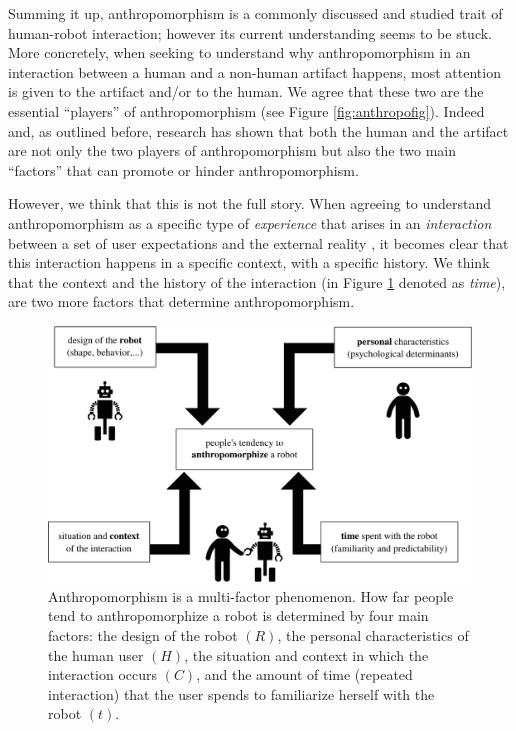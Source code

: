 \documentclass{frontiersSCNS} %
\begin{document}
Summing it up, anthropomorphism is a commonly discussed and studied trait of
human-robot interaction; however its current understanding seems to be stuck.
More concretely, when seeking to understand why anthropomorphism in an
interaction between a human and a non-human artifact happens, most attention is
given to the artifact and/or to the human. We agree that these two are the
essential ``players'' of anthropomorphism (see Figure \ref{fig:anthropofig}).
Indeed and, as outlined before, research has shown that both the human and the
artifact are not only the two players of anthropomorphism but also the two main
``factors'' that can promote or hinder anthropomorphism.

However, we think that this is not the full story. When agreeing to understand
anthropomorphism as a specific type of \textit{experience} that arises in an
\textit{interaction} between a set of user expectations and the external reality
\citep{persson_anthropomorphism_2000}, 
it becomes clear that this interaction happens in a specific context, with a
specific history. We think that the context and the history of the interaction
(in Figure \ref{fig:factors} denoted as \textit{time}), are two more factors
that determine anthropomorphism.

\begin{figure}
    \centering
    \includegraphics[width=0.7\columnwidth]{factors}
    \caption{Anthropomorphism is a multi-factor phenomenon. How far people tend
    to anthropomorphize a robot is determined by four main factors: the design
    of the robot $(R)$, the personal characteristics of the human user $(H)$, the
    situation and context in which the interaction occurs $(C)$, and the amount of
    time (repeated interaction) that the user spends to familiarize herself with the
    robot $(t)$.}

    \label{fig:factors}
\end{figure}
\end{document}
